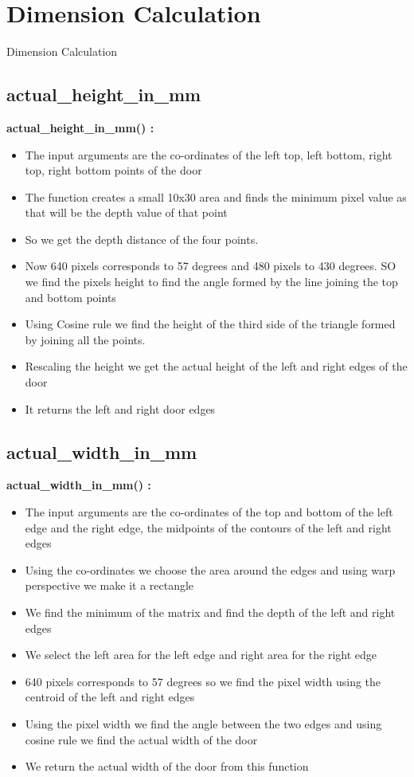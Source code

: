 \documentclass[10pt, a4paper]{beamer}
\begin{document}
\section{Dimension Calculation}
\begin{frame}[allowframebreaks]{Dimension Calculation}
  \subsection{actual\_height\_in\_mm}
    \textbf{actual\_height\_in\_mm() : }
      \begin{itemize}
       \item The input arguments are the co-ordinates of the left top, left bottom, right top, right bottom points of the door
       \item The function creates a small 10x30 area and finds the minimum pixel value as that will be the depth value of that point
       \item So we get the depth distance of the four points.
       \item Now 640 pixels corresponds to 57 degrees and 480 pixels to 430 degrees. SO we find the pixels height to find the angle formed by the line joining the top and bottom points
       \item Using Cosine rule we find the height of the third side of the triangle formed by joining all the points.
       \item Rescaling the height we get the actual height of the left and right edges of the door
       \item It returns the left and right door edges
      \end{itemize}
  \framebreak
  \subsection{actual\_width\_in\_mm}
    \textbf{actual\_width\_in\_mm() : }
      \begin{itemize}
       \item The input arguments are the co-ordinates of the top and bottom of the left edge and the right edge, the midpoints of the contours of the left and right edges
       \item Using the co-ordinates we choose the area around the edges and using warp perspective we make it a rectangle
       \item We find the minimum of the matrix and find the depth of the left and right edges
       \item We select the left area for the left edge and right area for the right edge
       \item 640 pixels corresponds to 57 degrees so we find the pixel width using the centroid of the left and right edges
       \item Using the pixel width we find the angle between the two edges and using cosine rule we find the actual width of the door
       \item We return the actual width of the door from this function
      \end{itemize}
  \framebreak

\end{frame}
\end{document}
